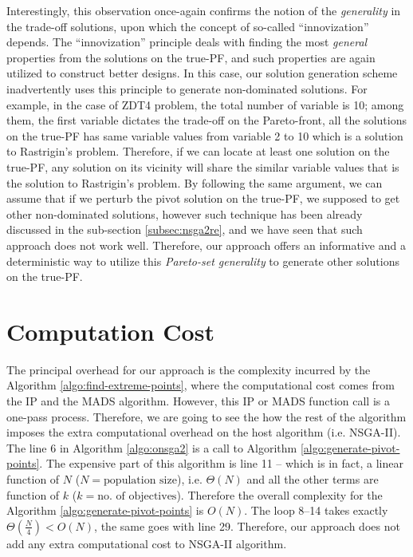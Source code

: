 \documentclass[journal]{IEEEtran}
\begin{document}
Interestingly, this observation once-again confirms the notion of the \textit{generality} in the trade-off solutions, upon which the concept of so-called ``innovization'' \cite{innovization} depends. The ``innovization'' principle deals with finding the most \textit{general} properties from the solutions on the true-PF, and such properties are again utilized to construct better designs. In this case, our solution generation scheme inadvertently uses this principle to generate non-dominated solutions. For example, in the case of ZDT4 problem, the total number of variable is 10; among them, the first variable dictates the trade-off on the Pareto-front, all the solutions on the true-PF has same variable values from variable 2 to 10 which is a solution to Rastrigin's problem. Therefore, if we can locate at least one solution on the true-PF, any solution on its vicinity will share the similar variable values that is the solution to Rastrigin's problem. By following the same argument, we can assume that if we perturb the pivot solution on the true-PF, we supposed to get other non-dominated solutions, however such technique has been already discussed in the sub-section \ref{subsec:nsga2re}, and we have seen that such approach does not work well. Therefore, our approach offers an informative and a deterministic way to utilize this \textit{Pareto-set generality} to generate other solutions on the true-PF.   

\section{Computation Cost}
\label{sec:big-o}
The principal overhead for our approach is the complexity incurred by the Algorithm \ref{algo:find-extreme-points}, where the computational cost comes from the IP and the MADS algorithm. However, this IP or MADS function call is a one-pass process. Therefore, we are going to see the how the rest of the algorithm imposes the extra computational overhead on the host algorithm (i.e. NSGA-II). The line 6 in Algorithm \ref{algo:onsga2} is a call to Algorithm \ref{algo:generate-pivot-points}. The expensive part of this algorithm is line 11 -- which is in fact, a linear function of \(N\) (\(N = \text{population size}\)), i.e. \(\Theta(N)\) and all the other terms are function of \(k\) (\(k = \text{no. of objectives}\)). Therefore the overall complexity for the Algorithm \ref{algo:generate-pivot-points} is \(O(N)\). The loop 8--14 takes exactly \(\Theta(\frac{N}{4}) < O(N)\), the same goes with line 29. Therefore, our approach does not add any extra computational cost to NSGA-II algorithm.
\end{document}

